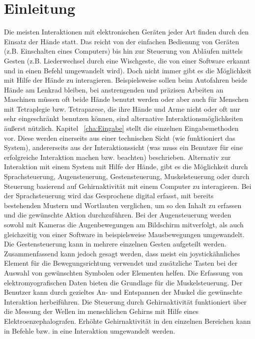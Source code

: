 \chapter{Einleitung}
\label{cha:Einleitung}

Die meisten Interaktionen mit elektronischen Geräten jeder Art finden durch den Einsatz der Hände statt. Das reicht von der einfachen Bedienung von Geräten (z.B. Einschalten eines Computers) bis hin zur Steuerung von Abläufen mittels Gesten (z.B. Liederwechsel durch eine Wischgeste, die von einer Software erkannt und in einen Befehl umgewandelt wird). Doch nicht immer gibt es die Möglichkeit mit Hilfe der Hände zu interagieren. Beispielsweise sollen beim Autofahren beide Hände am Lenkrad bleiben, bei anstrengenden und präzisen Arbeiten an Maschinen müssen oft beide Hände benutzt werden oder aber auch für Menschen mit Tetraplegie bzw. Tetraparese, die ihre Hände und Arme nicht oder oft nur sehr eingeschränkt benutzen können, sind alternative Interaktionsmöglichkeiten äußerst nützlich.
\newline \newline
Kapitel ~\ref{cha:Eingabe} stellt die einzelnen Eingabemethoden vor. Diese werden einerseits aus einer technischen Sicht (wie funktioniert das System), andererseits aus der Interaktionssicht (was muss ein Benutzer für eine erfolgreiche Interaktion machen bzw. beachten) beschrieben. Alternativ zur Interaktion mit einem System mit Hilfe der Hände, gibt es die Möglichkeit durch Sprachsteuerung, Augensteuerung, Gestensteuerung, Muskelsteuerung oder durch Steuerung basierend auf Gehirnaktivität mit einem Computer zu interagieren. Bei der Sprachsteuerung wird das Gesprochene digital erfasst, mit bereits bestehenden Mustern und Wortlauten verglichen, um so den Inhalt zu erfassen und die gewünschte Aktion durchzuführen. Bei der Augensteuerung werden sowohl mit Kameras die Augenbewegungen am Bildschirm mitverfolgt, als auch gleichzeitig von einer Software in beispielsweise Mausbewegungen umgewandelt. Die Gestensteuerung kann in mehrere einzelnen Gesten aufgeteilt werden. Zusammenfassend kann jedoch gesagt werden, dass meist ein joystickähnliches Element für die Bewegungsrichtung verwendet und zusätzliche Tasten bei der Auswahl von gewünschten Symbolen oder Elementen helfen. Die Erfassung von elektromyografischen Daten bieten die Grundlage für die Muskelsteuerung. Der Benutzer kann durch gezieltes An- und Entspannen der Muskel die gewünschte Interaktion herbeiführen. Die Steuerung durch Gehirnaktivität funktioniert über die Messung der Wellen im menschlichen Gehirns mit Hilfe eines  Elektroenzephalografen. Erhöhte Gehirnaktivität in den einzelnen Bereichen kann in Befehle bzw. in eine Interaktion umgewandelt werden.
